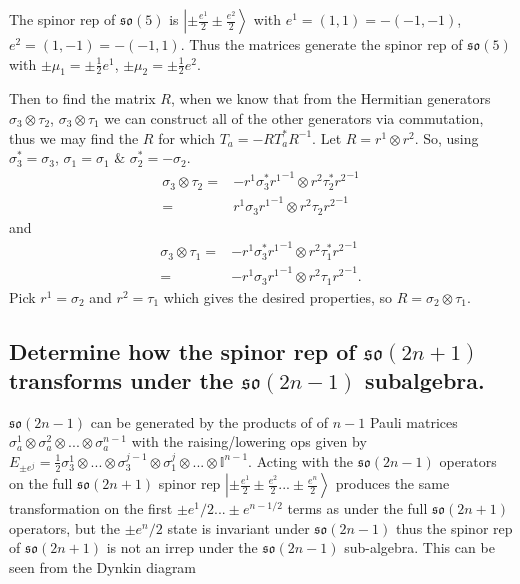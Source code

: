 \documentclass[main.tex]{subfiles}
\begin{document}
The spinor rep of $\mathfrak{so}(5)$ is $\left|\pm \frac{e^1}{2}\pm \frac{e^2}{2}\right>$ with $e^1=(1,1)=-(-1,-1)$, $e^2=(1,-1)=-(-1,1)$. Thus the matrices generate the spinor rep of $\mathfrak{so}(5)$ with $\pm\mu_1=\pm\frac{1}{2}e^1$, $\pm\mu_2=\pm\frac{1}{2}e^2$.

Then to find the matrix $R$, when we know that from the Hermitian generators $\sigma_3\otimes\tau_2$, $\sigma_3\otimes\tau_1$ we can construct all of the other generators via commutation, thus we may find the $R$ for which $T_a=-RT_a^*R^{-1}$. Let $R=r^1\otimes r^2$. So, using $\sigma_3^*=\sigma_3$, $\sigma_1=\sigma_1$ \& $\sigma_2^*=-\sigma_2$.
\begin{align}
\sigma_3\otimes\tau_2=&-r^1\sigma_3^*{r^1}^{-1}\otimes r^2\tau_2^*{r^2}^{-1}\\
=&r^1\sigma_3{r^1}^{-1}\otimes r^2\tau_2{r^2}^{-1}
\end{align}
and
\begin{align}
\sigma_3\otimes\tau_1=&-r^1\sigma_3^*{r^1}^{-1}\otimes r^2\tau_1^*{r^2}^{-1}\\
=&-r^1\sigma_3{r^1}^{-1}\otimes r^2\tau_1{r^2}^{-1}.
\end{align}
Pick $r^1=\sigma_2$ and $r^2=\tau_1$ which gives the desired properties, so $R=\sigma_2\otimes\tau_1$.

\subsection{Determine how the spinor rep of $\mathfrak{so}(2n+1)$ transforms under the $\mathfrak{so}(2n-1)$ subalgebra.}
$\mathfrak{so}(2n-1)$ can be generated by the products of of $n-1$ Pauli matrices $\sigma_a^1\otimes\sigma_a^2\otimes...\otimes\sigma_a^{n-1}$ with the raising/lowering ops given by $E_{\pm e^j}=\frac{1}{2}\sigma_3^1\otimes...\otimes\sigma_3^{j-1}\otimes\sigma_1^j\otimes...\otimes\mathbb{I}^{n-1}$.
Acting with the $\mathfrak{so}(2n-1)$ operators on the full $\mathfrak{so}(2n+1)$ spinor rep $\left|\pm\frac{e^1}{2}\pm\frac{e^2}{2}...\pm\frac{e^n}{2}\right>$ produces the same transformation on the first $\pm e^1/2...\pm e^{n-1/2}$ terms as under the full $\mathfrak{so}(2n+1)$ operators, but the $\pm e^n/2$ state is invariant under $\mathfrak{so}(2n-1)$ thus the spinor rep of $\mathfrak{so}(2n+1)$ is not an irrep under the $\mathfrak{so}(2n-1)$ sub-algebra. This can be seen from the Dynkin diagram 

\begin{center}
\end{center}
\end{document}
